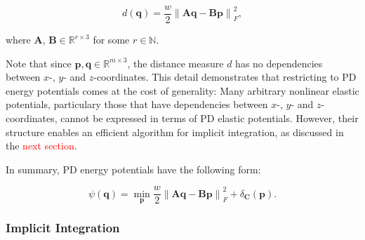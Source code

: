 \documentclass{article}
\newcommand{\norm}[1]{\left\lVert#1\right\rVert}
\begin{document}

\[
    d(\bm{q}) = \frac{w}{2} \norm{\bm{Aq} - \bm{Bp}}^2_F,
\]

where $\bm{A}$, $\bm{B} \in \mathbb{R}^{r \times 3}$ for some $r \in \mathbb{N}$.

Note that since $\bm{p}, \bm{q} \in \mathbb{R}^{m \times 3}$, the distance measure $d$ has no dependencies between $x$-, $y$- and 
$z$-coordinates. This detail demonstrates that restricting to PD energy potentials comes at the cost of generality: Many arbitrary 
nonlinear elastic potentials, particulary those that have dependencies between $x$-, $y$- and $z$-coordinates, cannot be expressed 
in terms of PD elastic potentials. However, their structure enables an efficient algorithm for implicit integration, as discussed in
the \textcolor{red}{next section}.

In summary, PD energy potentials have the following form:

\[
    \psi({\bm{q}}) = \min_{\bm{p}} \frac{w}{2} \norm{\bm{Aq} - \bm{Bp}}^2_F + \delta_{\bm{C}}(\bm{p}).
\]

\subsubsection*{Implicit Integration}
\end{document}
